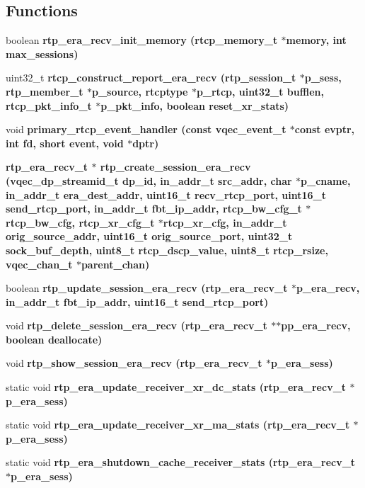\subsection*{Functions}
\begin{CompactItemize}
\item 
boolean \bf{rtp\_\-era\_\-recv\_\-init\_\-memory} (rtcp\_\-memory\_\-t $\ast$memory, int max\_\-sessions)
\item 
uint32\_\-t \bf{rtcp\_\-construct\_\-report\_\-era\_\-recv} (rtp\_\-session\_\-t $\ast$p\_\-sess, rtp\_\-member\_\-t $\ast$p\_\-source, rtcptype $\ast$p\_\-rtcp, uint32\_\-t bufflen, rtcp\_\-pkt\_\-info\_\-t $\ast$p\_\-pkt\_\-info, boolean reset\_\-xr\_\-stats)
\item 
void \bf{primary\_\-rtcp\_\-event\_\-handler} (const vqec\_\-event\_\-t $\ast$const evptr, int fd, short event, void $\ast$dptr)
\item 
\bf{rtp\_\-era\_\-recv\_\-t} $\ast$ \bf{rtp\_\-create\_\-session\_\-era\_\-recv} (vqec\_\-dp\_\-streamid\_\-t dp\_\-id, in\_\-addr\_\-t src\_\-addr, char $\ast$p\_\-cname, in\_\-addr\_\-t era\_\-dest\_\-addr, uint16\_\-t recv\_\-rtcp\_\-port, uint16\_\-t send\_\-rtcp\_\-port, in\_\-addr\_\-t fbt\_\-ip\_\-addr, rtcp\_\-bw\_\-cfg\_\-t $\ast$rtcp\_\-bw\_\-cfg, rtcp\_\-xr\_\-cfg\_\-t $\ast$rtcp\_\-xr\_\-cfg, in\_\-addr\_\-t orig\_\-source\_\-addr, uint16\_\-t orig\_\-source\_\-port, uint32\_\-t sock\_\-buf\_\-depth, uint8\_\-t rtcp\_\-dscp\_\-value, uint8\_\-t rtcp\_\-rsize, \bf{vqec\_\-chan\_\-t} $\ast$parent\_\-chan)
\item 
boolean \bf{rtp\_\-update\_\-session\_\-era\_\-recv} (\bf{rtp\_\-era\_\-recv\_\-t} $\ast$p\_\-era\_\-recv, in\_\-addr\_\-t fbt\_\-ip\_\-addr, uint16\_\-t send\_\-rtcp\_\-port)
\item 
void \bf{rtp\_\-delete\_\-session\_\-era\_\-recv} (\bf{rtp\_\-era\_\-recv\_\-t} $\ast$$\ast$pp\_\-era\_\-recv, boolean deallocate)
\item 
void \bf{rtp\_\-show\_\-session\_\-era\_\-recv} (\bf{rtp\_\-era\_\-recv\_\-t} $\ast$p\_\-era\_\-sess)
\item 
static void \bf{rtp\_\-era\_\-update\_\-receiver\_\-xr\_\-dc\_\-stats} (\bf{rtp\_\-era\_\-recv\_\-t} $\ast$p\_\-era\_\-sess)
\item 
static void \bf{rtp\_\-era\_\-update\_\-receiver\_\-xr\_\-ma\_\-stats} (\bf{rtp\_\-era\_\-recv\_\-t} $\ast$p\_\-era\_\-sess)
\item 
static void \bf{rtp\_\-era\_\-shutdown\_\-cache\_\-receiver\_\-stats} (\bf{rtp\_\-era\_\-recv\_\-t} $\ast$p\_\-era\_\-sess)
$$
\end{CompactItemize}
